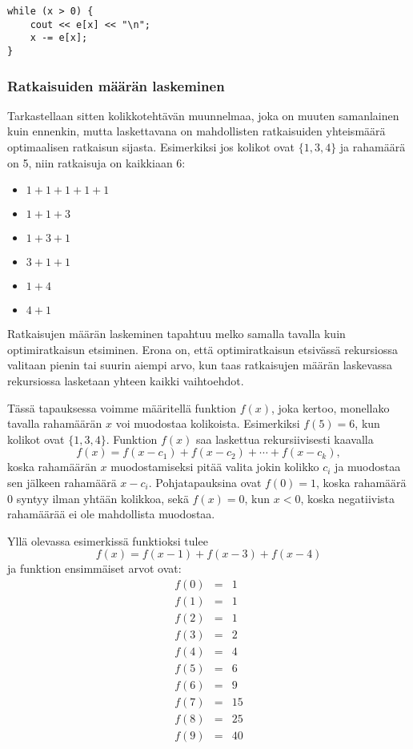 \begin{lstlisting}
while (x > 0) {
    cout << e[x] << "\n";
    x -= e[x];
}
\end{lstlisting}

\subsubsection{Ratkaisuiden määrän laskeminen}

Tarkastellaan sitten kolikkotehtävän muunnelmaa,
joka on muuten samanlainen kuin ennenkin,
mutta laskettavana on mahdollisten ratkaisuiden yhteismäärä
optimaalisen ratkaisun sijasta.
Esimerkiksi jos kolikot ovat $\{1,3,4\}$ ja rahamäärä on 5,
niin ratkaisuja on kaikkiaan 6:

\begin{multicols}{2}
\begin{itemize}
\item $1+1+1+1+1$
\item $1+1+3$
\item $1+3+1$
\item $3+1+1$
\item $1+4$
\item $4+1$
\end{itemize}
\end{multicols}

Ratkaisujen määrän laskeminen tapahtuu melko samalla tavalla
kuin optimiratkaisun etsiminen.
Erona on, että optimiratkaisun etsivässä rekursiossa
valitaan pienin tai suurin aiempi arvo,
kun taas ratkaisujen määrän laskevassa rekursiossa lasketaan
yhteen kaikki vaihtoehdot.

Tässä tapauksessa voimme määritellä funktion $f(x)$,
joka kertoo, monellako tavalla rahamäärän $x$
voi muodostaa kolikoista.
Esimerkiksi $f(5)=6$, kun kolikot ovat $\{1,3,4\}$.
Funktion $f(x)$ saa laskettua rekursiivisesti kaavalla
\[ f(x) = f(x-c_1)+f(x-c_2)+\cdots+f(x-c_k),\]
koska rahamäärän $x$ muodostamiseksi pitää
valita jokin kolikko $c_i$ ja muodostaa sen jälkeen rahamäärä $x-c_i$.
Pohjatapauksina ovat $f(0)=1$, koska rahamäärä 0 syntyy
ilman yhtään kolikkoa,
sekä $f(x)=0$, kun $x<0$, koska negatiivista rahamäärää
ei ole mahdollista muodostaa.

Yllä olevassa esimerkissä funktioksi tulee
\[ f(x) = f(x-1)+f(x-3)+f(x-4) \]
ja funktion ensimmäiset arvot ovat:
\[
\begin{array}{lcl}
f(0) & = & 1 \\
f(1) & = & 1 \\
f(2) & = & 1 \\
f(3) & = & 2 \\
f(4) & = & 4 \\
f(5) & = & 6 \\
f(6) & = & 9 \\
f(7) & = & 15 \\
f(8) & = & 25 \\
f(9) & = & 40 \\
\end{array}
\]

